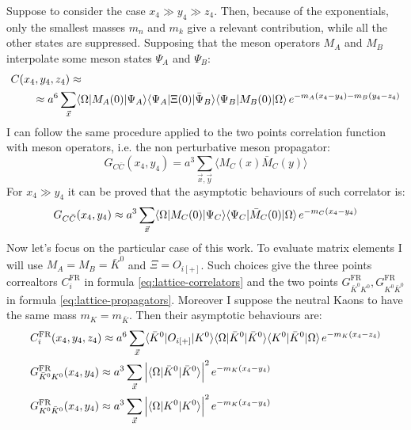 \documentclass[english, LaM, oneside, noexaminfo]{sapthesis}
\newcommand{\la}{\langle}
\newcommand{\ra}{\rangle}
\begin{document}
Suppose to consider the case $x_4 \gg y_4 \gg z_4$.
Then, because of the exponentials, only the smallest masses $m_n$ and $m_k$ give a relevant contribution, while all the other states are suppressed.
Supposing that the meson operators $M_A$ and $M_B$ interpolate some meson states $\Psi_A$ and $\Psi_B$:
\begin{equation}\label{eq:asymptotic-behav-3pts}
    \begin{split}
        & C(x_4,y_4,z_4)\approx \\
        & \qquad \approx  a^6\sum_{\vec x} \la \Omega | M_A(0) | \Psi_A \ra \la \Psi_A | \Xi (0) | \bar\Psi_B \ra \la \Psi_B | M_B (0) | \Omega \ra \hspace*{.5mm} e^{-m_A(x_4-y_4)-m_B(y_4-z_4)}
    \end{split}
\end{equation}
I can follow the same procedure applied to the two points correlation function with meson operators, i.e. the non perturbative meson propagator:
\begin{equation}\label{eq:2pts-correlator-meson}
    G_{C\bar C}(x_4,y_4) = a^3 \sum_{\vec x, \vec y} \la M_C (x) \bar M_C (y) \ra
\end{equation}
For $x_4 \gg y_4$ it can be proved that the asymptotic behaviours of such correlator is:
\begin{equation}\label{eq:asymptotic-behav-2pts}
    G_{C\bar C}(x_4,y_4) \approx a^3 \sum_{\vec x} \la \Omega | M_C (0) | \Psi_C \ra \la \Psi_C | \bar M_C (0) | \Omega \ra \hspace*{0.5mm} e^{-m_C(x_4-y_4)}
\end{equation}
Now let's focus on the particular case of this work.
To evaluate matrix elements I will use $M_A = M_B = \bar K^0$ and $\Xi = O_{i[+]}$.
Such choices give the three points correaltors $C_i^\text{FR}$ in formula \ref{eq:lattice-correlators} and the two points $G_{\bar K^0 K^0}^\text{FR}, G_{K^0 \bar  K^0}^\text{FR}$ in formula \ref{eq:lattice-propagators}.
Moreover I suppose the neutral Kaons to have the same mass $m_K = m_{\bar K}$.
Then their asymptotic behaviours are:
\begin{equation*}
    \begin{split}
        & C_i^\text{FR}(x_4,y_4,z_4) \approx a^6\sum_{\vec x} \la \bar K^0 | O_{i[+]} | K^0 \ra  \la \Omega | \bar K^0 | \bar K^0 \ra  \la K^0 | \bar K^0 | \Omega \ra  \hspace*{.5mm} e^{-m_K(x_4-z_4)}  \\
        & G_{\bar K^0 K^0}^\text{FR}(x_4,y_4) \approx a^3\sum_{\vec x} \Big| \la \Omega | \bar K^0 | \bar K^0 \ra \Big|^2 \hspace*{.5mm} e^{-m_K(x_4-y_4)} \\
        & G_{K^0\bar K^0}^\text{FR}(x_4,y_4) \approx a^3\sum_{\vec x} \Big| \la \Omega |  K^0 |  K^0 \ra \Big|^2 \hspace*{.5mm} e^{-m_K(x_4-y_4)} \\
    \end{split}
\end{equation*}
\end{document}
